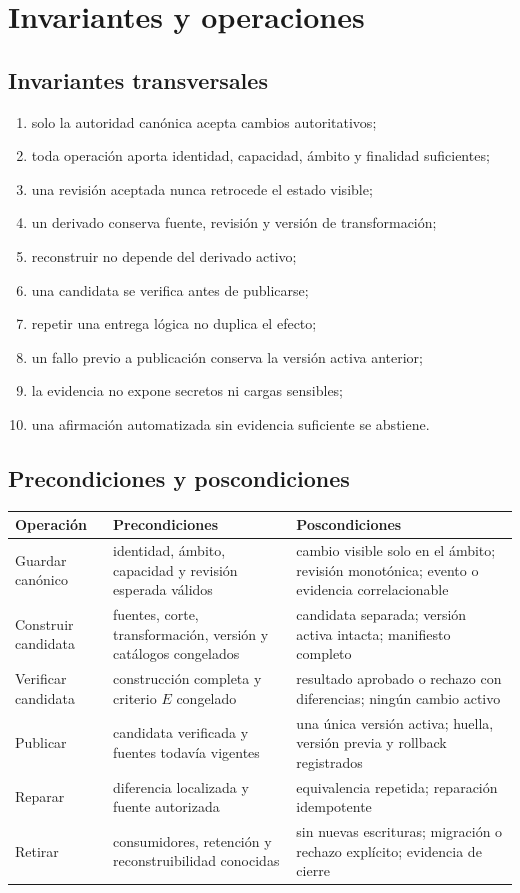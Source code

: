 \documentclass[11pt,letterpaper]{article}
\begin{document}
\section{Invariantes y operaciones}
\subsection{Invariantes transversales}
\begin{enumerate}
\item solo la autoridad canónica acepta cambios autoritativos;
\item toda operación aporta identidad, capacidad, ámbito y finalidad suficientes;
\item una revisión aceptada nunca retrocede el estado visible;
\item un derivado conserva fuente, revisión y versión de transformación;
\item reconstruir no depende del derivado activo;
\item una candidata se verifica antes de publicarse;
\item repetir una entrega lógica no duplica el efecto;
\item un fallo previo a publicación conserva la versión activa anterior;
\item la evidencia no expone secretos ni cargas sensibles;
\item una afirmación automatizada sin evidencia suficiente se abstiene.
\end{enumerate}

\subsection{Precondiciones y poscondiciones}
\begin{longtable}{p{.18\linewidth}p{.35\linewidth}p{.39\linewidth}}
\toprule Operación & Precondiciones & Poscondiciones \\ \midrule
Guardar canónico & identidad, ámbito, capacidad y revisión esperada válidos & cambio visible solo en el ámbito; revisión monotónica; evento o evidencia correlacionable \\
Construir candidata & fuentes, corte, transformación, versión y catálogos congelados & candidata separada; versión activa intacta; manifiesto completo \\
Verificar candidata & construcción completa y criterio $E$ congelado & resultado aprobado o rechazo con diferencias; ningún cambio activo \\
Publicar & candidata verificada y fuentes todavía vigentes & una única versión activa; huella, versión previa y rollback registrados \\
Reparar & diferencia localizada y fuente autorizada & equivalencia repetida; reparación idempotente \\
Retirar & consumidores, retención y reconstruibilidad conocidas & sin nuevas escrituras; migración o rechazo explícito; evidencia de cierre \\ \bottomrule
\end{longtable}
\end{document}

